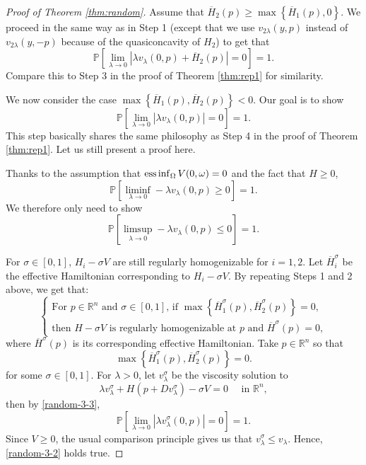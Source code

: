 \documentclass[12pt,reqno]{amsart}
\theoremstyle{plain}
\theoremstyle{remark}
\numberwithin{equation}{section}
\newcommand{\bP}{\mathbb{P}}
\newcommand{\R}{\mathbb{R}}
\newcommand{\lam}{\lambda}
\newcommand{\sig}{\sigma}
\newcommand{\om}{\omega}
\newcommand{\Om}{\Omega}
\newcommand{\ol}{\overline}
\begin{document}
\begin{proof}[Proof of Theorem \ref{thm:random}]
 Assume that $\ol{H}_2(p) \geq \max\left\{\ol{H}_1(p),0\right\}$.
We proceed in the same way as in Step 1 (except that we use $v_{2\lam}(y,p)$ instead of $v_{2\lam}(y,-p)$
because of the quasiconcavity of $H_2$) to get that
\begin{equation}\label{random-2-1}
\bP \left[ \lim_{\lam\to 0} \left|\lam v_\lam(0,p) + \ol{H}_2(p)\right|=0\right]=1.
\end{equation}
Compare this to Step 3 in the proof of Theorem \ref{thm:rep1} for similarity.
\smallskip

 We now consider the case $\max\left\{\ol{H}_1(p), \ol{H}_2(p) \right\} <0$.
Our goal is to show 
\begin{equation}\label{random-3-1}
\bP \left[ \lim_{\lam\to 0} \left|\lam v_\lam(0,p)\right|=0\right]=1.
\end{equation}
This step basically shares the same philosophy as Step 4 in the proof of Theorem \ref{thm:rep1}.
Let us still present a proof here.

Thanks to the assumption that ${\rm ess}\inf_{\Om} V(0,\om)=0$ and the fact that $H \geq 0$, 
\begin{equation}\label{random-3-2}
\bP \left[ \liminf_{\lam\to 0} -\lam v_\lam(0,p) \geq 0\right]=1.
\end{equation}
We therefore only need to show
\begin{equation}\label{random-3-2}
\bP \left[ \limsup_{\lam\to 0} -\lam v_\lam(0,p) \leq 0\right]=1.
\end{equation}

For $\sig \in [0,1]$, $H_i - \sig V$ are still regularly homogenizable for $i=1,2$.
Let $\ol{H}_i^\sig$ be the effective Hamiltonian corresponding to $H_i-\sig V$.
By repeating Steps 1 and 2 above, we get that:
\begin{equation}\label{random-3-3}
\begin{cases}
\text{For $p \in \R^n$ and $\sig \in [0,1]$, if $\max\left\{ \ol{H}_1^\sig(p),\ol{H}_2^\sig(p) \right\}=0$,}\\
\text{then $H-\sig V$ is regularly homogenizable at $p$ and $\ol{H}^\sig(p)=0$},
\end{cases}
\end{equation}
where $\ol{H}^\sig(p)$ is its corresponding effective Hamiltonian.
Take $p\in \R^n$ so that 
\begin{equation}\label{random-3-4}
\max\left\{ \ol{H}_1^\sig(p),\ol{H}_2^\sig(p) \right\}=0.
\end{equation}
for some $\sigma\in [0,1]$.   For $\lam>0$, let $v_\lam^\sig$ be the viscosity solution to
\[
\lam v_\lam^\sig + H(p+Dv_\lam^\sig) - \sig V =0 \quad \text{ in } \R^n,
\]
then by  \eqref{random-3-3}, 
\[
\bP \left[ \lim_{\lam\to 0} \left|\lam v_\lam^\sig(0,p)\right|=0\right]=1.
\]
Since $V\geq 0$, the usual comparison principle gives us that $v_\lam^\sig \leq v_\lam$. Hence, \eqref{random-3-2} holds true.


\end{proof}
\end{document}
